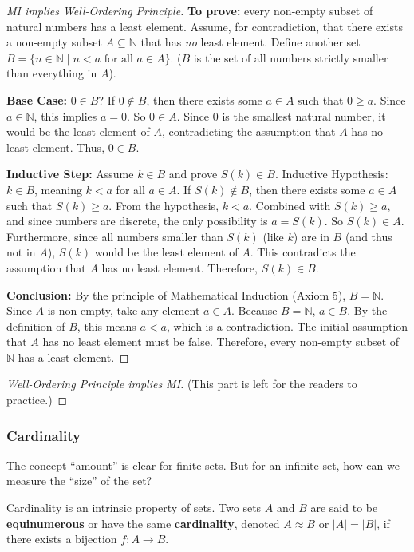 \documentclass[oneside]{book}
\begin{document}
\begin{proof}[MI implies Well-Ordering Principle]
\textbf{To prove:} every non-empty subset of natural numbers has a least element.
Assume, for contradiction, that there exists a non-empty subset $A \subseteq \mathbb{N}$ that has \emph{no} least element.
Define another set $B = \{ n \in \mathbb{N} \mid n < a \text{ for all } a \in A \}$. ($B$ is the set of all numbers strictly smaller than everything in $A$).

\textbf{Base Case:} $0 \in B$?
If $0 \notin B$, then there exists some $a \in A$ such that $0 \ge a$. Since $a \in \mathbb{N}$, this implies $a=0$. So $0 \in A$. Since 0 is the smallest natural number, it would be the least element of $A$, contradicting the assumption that $A$ has no least element. Thus, $0 \in B$.

\textbf{Inductive Step:} Assume $k \in B$ and prove $S(k) \in B$.
Inductive Hypothesis: $k \in B$, meaning $k < a$ for all $a \in A$.
If $S(k) \notin B$, then there exists some $a \in A$ such that $S(k) \ge a$.
From the hypothesis, $k < a$. Combined with $S(k) \ge a$, and since numbers are discrete, the only possibility is $a = S(k)$.
So $S(k) \in A$. Furthermore, since all numbers smaller than $S(k)$ (like $k$) are in $B$ (and thus not in $A$), $S(k)$ would be the least element of $A$.
This contradicts the assumption that $A$ has no least element. Therefore, $S(k) \in B$.

\textbf{Conclusion:} By the principle of Mathematical Induction (Axiom 5), $B = \mathbb{N}$.
Since $A$ is non-empty, take any element $a \in A$. Because $B = \mathbb{N}$, $a \in B$.
By the definition of $B$, this means $a < a$, which is a contradiction.
The initial assumption that $A$ has no least element must be false.
Therefore, every non-empty subset of $\mathbb{N}$ has a least element.
\end{proof}

\begin{proof}[Well-Ordering Principle implies MI]
(This part is left for the readers to practice.)
\end{proof}

\subsubsection*{Cardinality}
The concept “amount” is clear for finite sets. But for an infinite set, how can we measure the “size” of the set?
\begin{definition}
Cardinality is an intrinsic property of sets. Two sets $A$ and $B$ are said to be \textbf{equinumerous} or have the same \textbf{cardinality}, denoted $A \approx B$ or $|A|=|B|$, if there exists a bijection $f: A \to B$.
\end{definition}
\end{document}
